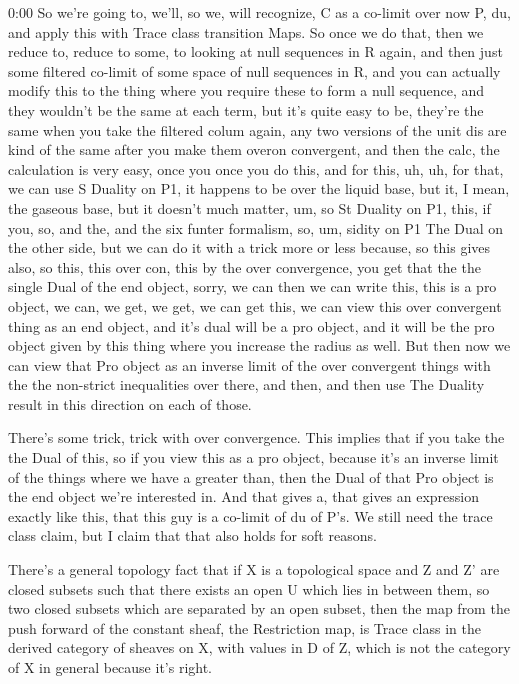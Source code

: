 \begin{unfinished}{0:00}
So we're going to, we'll, so we, will recognize, C as a co-limit over now P, du, and apply this with Trace class transition Maps. So once we do that, then we reduce to, reduce to some, to looking at null sequences in R again, and then just some filtered co-limit of some space of null sequences in R, and you can actually modify this to the thing where you require these to form a null sequence, and they wouldn't be the same at each term, but it's quite easy to be, they're the same when you take the filtered colum again, any two versions of the unit dis are kind of the same after you make them overon convergent, and then the calc, the calculation is very easy, once you once you do this, and for this, uh, uh, for that, we can use S Duality on P1, it happens to be over the liquid base, but it, I mean, the gaseous base, but it doesn't much matter, um, so St Duality on P1, this, if you, so, and the, and the six funter formalism, so, um, sidity on P1
The Dual on the other side, but we can do it with a trick more or less because, so this gives also, so this, this over con, this by the over convergence, you get that the the single Dual of the end object, sorry, we can then we can write this, this is a pro object, we can, we get, we get, we can get this, we can view this over convergent thing as an end object, and it's dual will be a pro object, and it will be the pro object given by this thing where you increase the radius as well. But then now we can view that Pro object as an inverse limit of the over convergent things with the the non-strict inequalities over there, and then, and then use The Duality result in this direction on each of those.

There's some trick, trick with over convergence. This implies that if you take the the Dual of this, so if you view this as a pro object, because it's an inverse limit of the things where we have a greater than, then the Dual of that Pro object is the end object we're interested in. And that gives a, that gives an expression exactly like this, that this guy is a co-limit of du of P's. We still need the trace class claim, but I claim that that also holds for soft reasons.

There's a general topology fact that if X is a topological space and Z and Z' are closed subsets such that there exists an open U which lies in between them, so two closed subsets which are separated by an open subset, then the map from the push forward of the constant sheaf, the Restriction map, is Trace class in the derived category of sheaves on X, with values in D of Z, which is not the category of X in general because it's right.


\end{unfinished}
